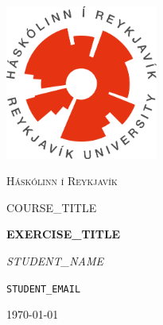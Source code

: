 \documentclass{scrartcl}
\begin{document}
\begin{titlepage}
    \centering
    \includegraphics[width=5cm]{assets/RU_2.png}\par
    \vspace{1cm}
    {\scshape\LARGE Háskólinn í Reykjavík \par}
    \vspace{1cm}
    {\scshape\Large COURSE_TITLE \par}
	\vspace{1.5cm}
	{\huge\bfseries EXERCISE_TITLE \par}
	\vspace{2cm}
	{\Large\itshape STUDENT_NAME}\par
	\texttt{STUDENT_EMAIL}\par
	\vfill

	\vspace{1cm}

	{\large \today\par}
\end{titlepage}

\newpage
\tableofcontents

\newpage
\section{}
\subsection{}

\end{document}
